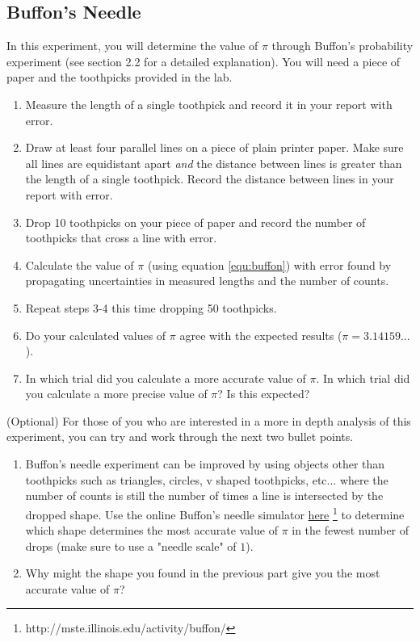 \subsection{Buffon's Needle}
In this experiment, you will determine the value of $\pi$ through Buffon's probability experiment (see section 2.2 for a detailed explanation). You will need a piece of paper and the toothpicks provided in the lab.
\begin{enumerate}
\item Measure the length of a single toothpick and record it in your report with error.
\item Draw at least four parallel lines on a piece of plain printer paper. Make sure all lines are equidistant apart {\it{and}} the distance between lines is greater than the length of a single toothpick. Record the distance between lines in your report with error.
\item Drop 10 toothpicks on your piece of paper and record the number of toothpicks that cross a line with error.
\item Calculate the value of $\pi$ (using equation \ref{equ:buffon}) with error found by propagating uncertainties in measured lengths and the number of counts.
\item Repeat steps 3-4 this time dropping 50 toothpicks.
\item Do your calculated values of $\pi$ agree with the expected results ($\pi = 3.14159...$).
\item In which trial did you calculate a more accurate value of $\pi$. In which trial did you calculate a more precise value of $\pi$? Is this expected?
\end{enumerate}
(Optional) For those of you who are interested in a more in depth analysis of this experiment, you can try and work through the next two bullet points.
\begin{enumerate}
\item Buffon's needle experiment can be improved by using objects other than toothpicks such as triangles, circles, v shaped toothpicks, etc... where the number of counts is still the number of times a line is intersected by the dropped shape. Use the online Buffon's needle simulator \href{http://mste.illinois.edu/activity/buffon/}{here} \footnote{http://mste.illinois.edu/activity/buffon/} to determine which shape determines the most accurate value of $\pi$ in the fewest number of drops (make sure to use a "needle scale" of $1$). 
\item Why might the shape you found in the previous part give you the most accurate value of $\pi$?
\end{enumerate}


